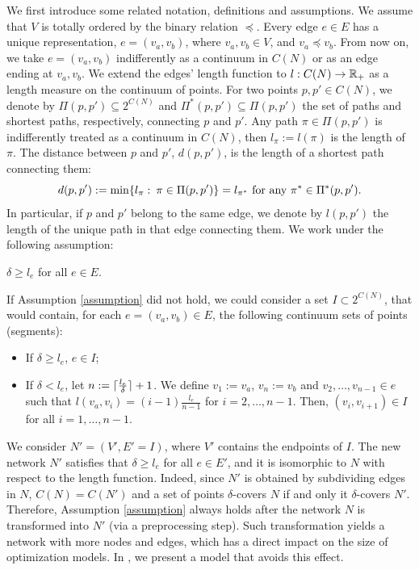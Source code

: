 We first introduce some related notation, definitions and assumptions.
We assume that $V$ is totally ordered by the binary relation $\preceq$. Every edge $e \in E$ has a unique representation, $e = (v_a, v_b)$, where $v_a, v_b \in V$, and $v_a \preceq v_b$. From now on, we take $e=(v_a, v_b)$ indifferently as a continuum in $C(N)$ or as an edge ending at  $v_a, v_b$. We extend the edges' length function to  $l: C(N) \to \mathbb R_+$ as a length measure on the continuum of points.   For two points $p, p' \in C(N)$, we denote by $\Pi(p,p') \subseteq 2^{C(N)}$ and $\Pi^*(p,p') \subseteq \Pi(p,p')$ the set of paths and shortest paths, respectively, connecting $p$ and $p'$. Any path $\pi\in \Pi(p,p')$ is indifferently treated as a continuum in $C(N)$, then $l_{\pi}:=l(\pi)$ is the length of $\pi$.  The distance between $p$ and  $p'$, $d(p, p')$, is the length of a shortest path connecting them:
$$d(p,p') := \min\{l_{\pi}: \:\pi\in \Pi(p,p')\}=l_{\pi^*} \textup{ for any } \pi^*\in \Pi^*(p,p').$$
In particular, if $p$ and $p'$ belong to the same edge, we denote by $l(p,p')$ the length of the unique path in that edge connecting them.
We work under the following assumption:
\begin{assumption} \label{assumption}
$\delta \ge l_e$ for all $e \in E$.
\end{assumption}
If Assumption \ref{assumption} did not hold, we could consider a set $I \subset  2^{C(N)}$, that would contain, for each $e = (v_a, v_b) \in E$, the following continuum sets of points (segments):
\begin{itemize}
	\item If $\delta \ge l_e$, $e \in I$;
	\item If $\delta < l_e$, let  $n:= \lceil\frac{l_e}{\delta}\rceil+1$. We define $v_1:= v_a$, $v_n:= v_b$ and $v_2,\hdots, v_{n-1}\in e$ such that $l(v_a,v_i) = (i -1) \frac{l_e}{n-1}$ for $i=2,\ldots, n-1$. Then, $(v_{i}, v_{i+1}) \in I$ for all $i=1,\ldots,n-1$.
\end{itemize}
We consider $N'=(V',E'=I)$, where $V'$ contains the endpoints of $I$. The new network $N'$ satisfies that $\delta \ge l_e$ for all $e\in E'$, and it is isomorphic to $N$ with respect to the length function. Indeed, since $N'$ is obtained by subdividing edges in $N$,  $C(N)=C(N')$ and a set of points $\delta$-covers $N$  if and only it $\delta$-covers $N'$. Therefore, Assumption \ref{assumption} always holds after the network $N$ is transformed into $N'$ (via a preprocessing step). Such transformation yields a network with more nodes and edges, which has a direct impact on the size of optimization models. In , we present a model that avoids this effect.  

